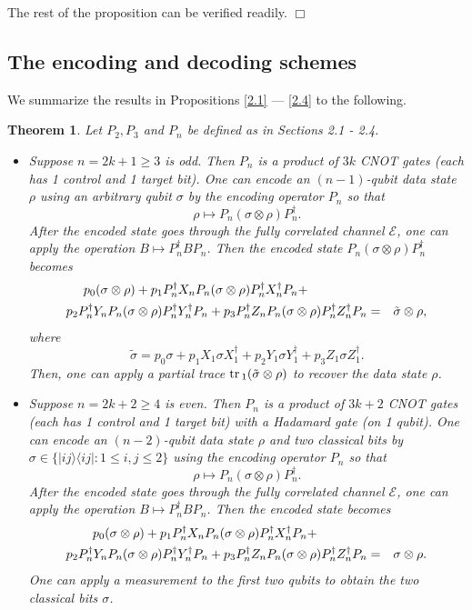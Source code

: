 \documentclass[11pt]{article}
\newtheorem{theorem}{Theorem}[section]
\def\qed{\hfill $\Box$\medskip}
\def\cE{{\mathcal E}}
\def\ra{{\rangle}}
\def\la{{\langle}}
\def\tr{{\rm tr}\,}
\begin{document}
The rest of the proposition can be verified readily. \qed



\subsection{The encoding and decoding schemes}


We summarize the results in  Propositions \ref{2.1} --- \ref{2.4} to the following.

\begin{theorem} \label{2.5}
Let $P_2, P_3$ and $P_n$ be defined as in Sections 2.1 - 2.4.

\begin{itemize}
\item[{\rm (a)}] Suppose $n = 2k+1 \ge 3$ is odd. Then 
$P_n$ is a product of $3k$ CNOT gates
(each has 1 control and 1 target bit). One can 
encode an $(n-1)$-qubit data state $\rho$ using an 
arbitrary qubit $\sigma$ by the encoding operator $P_n$ so that
$$\rho \mapsto P_n(\sigma \otimes \rho)P_n^\dag.$$
After the encoded state goes through the fully correlated
channel $\cE$, one can apply the operation 
$B \mapsto P_n^\dag B P_n$. Then the encoded state 
$P_n(\sigma\otimes \rho)P_n^\dag$ becomes    
    \begin{eqnarray*}
    p_0 (\sigma \otimes \rho) +
    p_1 P_n^\dag X_n P_n(\sigma \otimes \rho) P_n^\dag X_n^\dag P_n + \hskip .6in \ &&\\
    p_2 P_n^\dag Y_n P_n(\sigma \otimes \rho) P_n^\dag Y_n^\dag P_n + 
p_3 P_n^\dag Z_n P_n(\sigma \otimes \rho) P_n^\dag Z_n^\dag P_n
& = & \tilde \sigma \otimes \rho,
\end{eqnarray*}
where
$$\tilde \sigma 
= p_0 \sigma + p_1 X_1\sigma X_1^\dag + p_2 Y_1\sigma Y_1^\dag
+ p_3 Z_1 \sigma Z_1^\dag.$$ 
Then, one can apply 
a partial trace $\tr_1(\tilde \sigma \otimes \rho)$
to recover the data state $\rho$.
\item[{\rm (b)}] Suppose $n = 2k+2 \ge 4$ is even.
Then $P_n$ is a product of $3k+2$ CNOT gates (each has 
1 control and 1 target bit) with a Hadamard gate (on 1 qubit).
One can  
encode an $(n-2)$-qubit data state $\rho$ and
two classical bits by $\sigma \in \{|ij\ra \la ij|:
1 \le i,j \le 2\}$ using the encoding operator $P_n$ so that
$$\rho \mapsto P_n(\sigma \otimes \rho)P_n^\dag.$$
After the encoded state goes through the fully correlated 
channel $\cE$, one can apply the operation 
$B \mapsto P_n^\dag B P_n$. Then the encoded state becomes
\begin{eqnarray*}
   p_0 (\sigma \otimes \rho) + 
p_1 P_n^\dag X_n P_n(\sigma \otimes \rho) P_n^\dag X_n^\dag P_n + 
\hskip .5in \ 
 &&\\
 p_2 P_n^\dag Y_n P_n(\sigma \otimes \rho) P_n^\dag Y_n^\dag P_n 
 +p_3 P_n^\dag Z_n P_n(\sigma \otimes \rho) P_n^\dag Z_n^\dag P_n
& = & \sigma \otimes \rho.
\end{eqnarray*}
One can apply a measurement to the first two qubits to obtain the two classical bits $\sigma$.
\end{itemize}
\end{theorem}
\end{document}
